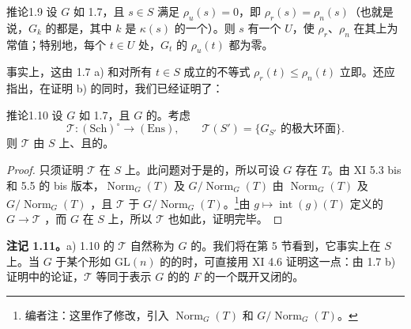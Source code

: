 \begin{SGAresult}{推论}{1.9}
设 $G$ 如 1.7，且 $s\in S$ 满足 $\rho_u(s)=0$，即 $\rho_r(s)=\rho_n(s)$（也就是说，$G_k$ 的都是，其中 $k$ 是 $\kappa(s)$ 的一个）。则 $s$ 有一个 $U$，使 $\rho_r$、$\rho_n$ 在其上为常值；特别地，每个 $t\in U$ 处，$G_t$ 的 $\rho_u(t)$ 都为零。
\end{SGAresult}
事实上，这由 1.7 a) 和对所有 $t\in S$ 成立的不等式 $\rho_r(t)\leq\rho_n(t)$ 立即。还应指出，在证明 b) 的同时，我们已经证明了：
\begin{SGAresult}{推论}{1.10}
设 $G$ 如 1.7，且 $G$ 的。考虑
\[\mathcal T:(\mathrm{Sch})^\circ\longrightarrow(\mathrm{Ens}),\qquad
\mathcal T(S')=\{G_{S'}\text{ 的极大环面}\}.\]
则 $\mathcal T$ 由 $S$ 上、且的。
\end{SGAresult}
\begin{proof}
只须证明 $\mathcal T$ 在 $S$ 上。此问题对于是的，所以可设 $G$ 存在 $T$。由 XI 5.3 bis 和 5.5 的 bis 版本，$\operatorname{Norm}_G(T)$ 及 $G/\operatorname{Norm}_G(T)$ 由 $\operatorname{Norm}_G(T)$ 及 $G/\operatorname{Norm}_G(T)$ ，且 $\mathcal T$ 于 $G/\operatorname{Norm}_G(T)$。\footnote[4]{编者注：这里作了修改，引入 $\operatorname{Norm}_G(T)$ 和 $G/\operatorname{Norm}_G(T)$。}由 $g\mapsto\operatorname{int}(g)(T)$ 定义的 $G\to\mathcal T$ ，而 $G$ 在 $S$ 上，所以 $\mathcal T$ 也如此，证明完毕。
\end{proof}
\textbf{注记 1.11。}a) 1.10 的 $\mathcal T$ 自然称为 $G$ 的。我们将在第 5 节看到，它事实上在 $S$ 上。当 $G$ 于某个形如 $\mathrm{GL}(n)$ 的的时，可直接用 XI 4.6 证明这一点：由 1.7 b) 证明中的论证，$\mathcal T$ 等同于表示 $G$ 的的 $F$ 的一个既开又闭的。

